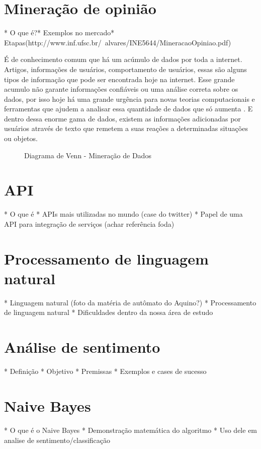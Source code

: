 \section{Mineração de opinião}\label{sec:mineracao_dados}

* O que é?* Exemplos no mercado* Etapas(http://www.inf.ufsc.br/~alvares/INE5644/MineracaoOpiniao.pdf)

É de conhecimento comum que há um acúmulo de dados por toda a internet. Artigos, informações de usuários, comportamento de usuários, essas são alguns tipos de informação que pode ser encontrada hoje na internet. Esse grande acumulo não garante informações confiáveis ou uma análise correta sobre os dados, por isso hoje há uma grande urgência para novas teorias computacionais e ferramentas que ajudem a analisar essa quantidade de dados que só aumenta \cite{fayyad1996data}. E dentro dessa enorme gama de dados, existem as informações adicionadas por usuários através de texto que remetem a suas reações a determinadas situações ou objetos.


\begin{figure}[ht]
	\centering{}
	\caption{Diagrama de Venn - Mineração de Dados}
	\label{uni}
\end{figure} 

\section{API}\label{sec:api}
* O que é
* APIs mais utilizadas no mundo (case do twitter)
* Papel de uma API para integração de serviços (achar referência foda)

\section{Processamento de linguagem natural}\label{sec:nlp}
* Linguagem natural (foto da matéria de autômato do Aquino?)
* Processamento de linguagem natural
* Dificuldades dentro da nossa área de estudo

\section{Análise de sentimento}\label{sec:analise_sentimento}
* Definição
* Objetivo
* Premissas
* Exemplos e cases de sucesso


\section{Naive Bayes}\label{sec:naive_bayes}
* O que é o Naive Bayes
* Demonstração matemática do algoritmo
* Uso dele em analise de sentimento/classificação


